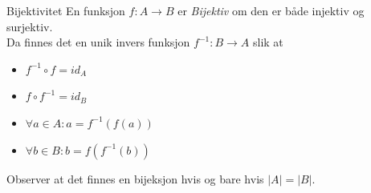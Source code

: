 \begin{frame}{Bijektivitet}
En funksjon $f : A \rightarrow B$ er \emph{Bijektiv} om den er både injektiv og surjektiv.\\
    \pause
    Da finnes det en unik invers funksjon $f^{-1} : B \rightarrow A$ slik at 
    \begin{itemize}
        \item $f^{-1} \circ f = id_A$
        \pause
        \item $f \circ f^{-1} = id_B$
        \pause
        \item $\forall a \in A : a = f^{-1}(f(a))$
        \pause
        \item $\forall b \in B : b = f(f^{-1}(b))$
    \end{itemize}

    \pause
\begin{figure}
        \centering
        \pause
        \qquad
        \pause
        \qquad
        \pause
        \qquad
        \label{fig:bij}
    \end{figure}

    \pause
    Observer at det finnes en bijeksjon hvis og bare hvis $|A| = |B|$.
\end{frame}

